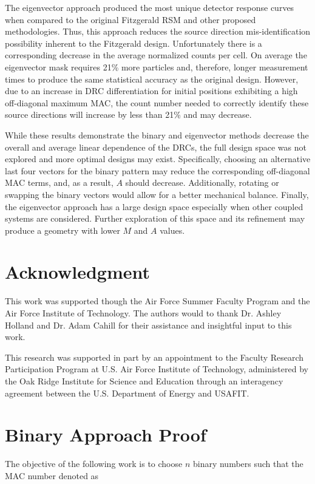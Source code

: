 \documentclass[3p,times]{elsarticle}
\begin{document}
The eigenvector approach produced the most unique detector response curves when compared to the original Fitzgerald RSM and other proposed methodologies. 
Thus, this approach reduces the source direction mis-identification possibility inherent to the Fitzgerald design.
Unfortunately there is a corresponding decrease in the average normalized counts per cell.
On average the eigenvector mask requires 21\% more particles and, therefore, longer measurement times to produce the same statistical accuracy as the original design.
However, due to an increase in DRC differentiation for initial positions exhibiting a high off-diagonal maximum MAC, the count number needed to correctly identify these source directions will increase by less than 21\% and may decrease. 

While these results demonstrate the binary and eigenvector methods decrease the overall and average linear dependence of the DRCs, the full design space was not explored and more optimal designs may exist.  
Specifically, choosing an alternative last four vectors for the binary pattern may reduce the corresponding off-diagonal MAC terms, and, as a result, $A$ should decrease.  
Additionally, rotating or swapping the binary vectors would allow for a better mechanical balance.  
Finally, the eigenvector approach has a large design space especially when other coupled systems are considered.  
Further exploration of this space and its refinement may produce a geometry with lower $M$ and $A$ values.

\section{Acknowledgment}
This work was supported though the Air Force Summer Faculty Program and the Air Force Institute of Technology.  
The authors would to thank Dr. Ashley Holland and Dr. Adam Cahill for their assistance and insightful input to this work.

This research was supported in part by an appointment to the Faculty Research Participation Program at U.S.
Air Force Institute of Technology, administered by the Oak Ridge Institute for Science and Education through an
interagency agreement between the U.S. Department of Energy and USAFIT.

\appendix

\section{Binary Approach Proof} \label{sec:proof}
The objective of the following work is to choose $n$ binary numbers such that the MAC number denoted as 
\end{document}
